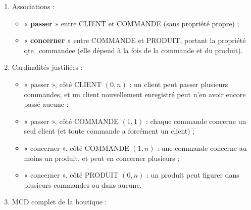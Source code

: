 \documentclass[11pt]{article}
\begin{document}
\begin{corrige}
\begin{enumerate}
\begin{itemize}
\item COMMANDE (\underline{num\_commande}, date\_commande) ;
\item PRODUIT (\underline{ref\_produit}, designation, prix\_unitaire, qte\_stock).
\end{itemize}
\item Associations :
\begin{itemize}
\item « \textbf{passer} » entre CLIENT et COMMANDE (sans propriété propre) ;
\item « \textbf{concerner} » entre COMMANDE et PRODUIT, portant la propriété qte\_commandee (elle dépend à la fois de la commande et du produit).
\end{itemize}
\item Cardinalités justifiées :
\begin{itemize}
\item « passer », côté CLIENT $(0, n)$ : un client peut passer plusieurs commandes, et un client nouvellement enregistré peut n'en avoir encore passé aucune ;
\item « passer », côté COMMANDE $(1, 1)$ : chaque commande concerne un seul client (et toute commande a forcément un client) ;
\item « concerner », côté COMMANDE $(1, n)$ : une commande concerne au moins un produit, et peut en concerner plusieurs ;
\item « concerner », côté PRODUIT $(0, n)$ : un produit peut figurer dans plusieurs commandes ou dans aucune.
\end{itemize}
\item MCD complet de la boutique :
\begin{popfigure}
\begin{center}
\end{center}
\end{popfigure}
\end{enumerate}
\end{corrige}
\end{document}
